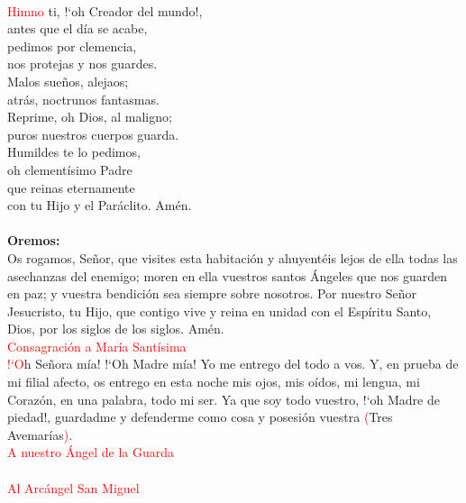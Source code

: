 \documentclass[9pt]{article}
\begin{document}
\begin{multicols}{2}
      \begin{otherlanguage}{latin}
            \\[2mm]
      \end{otherlanguage}
      \noindent\textcolor{red}{Himno}
      ti, {!`}oh Creador del mundo!,\\
      antes que el día se acabe,\\
      pedimos por clemencia,\\
      nos protejas y nos guardes.\\
      Malos sueños, alejaos;\\
      atrás, noctrunos fantasmas.\\
      Reprime, oh Dios, al maligno;\\
      puros nuestros cuerpos guarda.\\
      Humildes te lo pedimos,\\
      oh clementísimo Padre\\
      que reinas eternamente\\
      con tu Hijo y el Paráclito. Amén.\\[1mm]
      \\[1mm]
      \textbf{Oremos:}\\
      Os rogamos, Señor, que visites esta habitación y ahuyentéis lejos de ella todas las asechanzas del enemigo; moren en ella vuestros santos Ángeles
      que nos guarden en paz; y vuestra bendición sea siempre sobre nosotros. Por nuestro Señor Jesucristo, tu Hijo, que contigo vive y reina en unidad
      con el Espíritu Santo, Dios, por los siglos de los siglos. Amén.\\[2mm]
      \textcolor{red}{Consagración a María Santísima}\\
      \textcolor{red}{{!`}O}h Señora mía! {!`}Oh Madre mía! Yo me entrego del todo a vos. Y, en prueba de mi filial afecto, os entrego en esta noche mis ojos, mis oídos, mi lengua, mi Corazón,
      en una palabra, todo mi ser. Ya que soy todo vuestro, {!`}oh Madre de piedad!, guardadme y defenderme como cosa y posesión vuestra \textcolor{red}{(}Tres Avemarías\textcolor{red}{)}.\\[1mm]
      \textcolor{red}{A nuestro Ángel de la Guarda}\\
      \\[1mm]
      \textcolor{red}{Al Arcángel San Miguel}\\
      \\[1mm]
      
\end{multicols}
\end{document}
